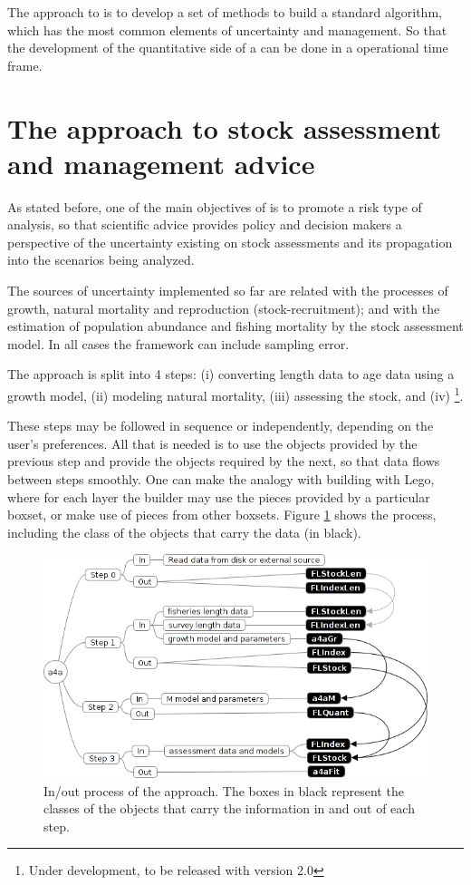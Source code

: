 \documentclass[a4paper,english,10pt]{article}\usepackage[]{graphicx}\usepackage[]{color}
\begin{document}
The \aFa approach to \MSE is to develop a set of methods to build a standard algorithm, which has the most common elements of uncertainty and management. So that the development of the quantitative side of a \MSE can be done in a operational time frame.

\section{The \aFa approach to stock assessment and management advice}

As stated before, one of the main objectives of \aFa is to promote a risk type of analysis, so that scientific advice provides policy and decision makers a perspective of the uncertainty existing on stock assessments and its propagation into the scenarios being analyzed.

The sources of uncertainty implemented so far are related with the processes of growth, natural mortality and reproduction (stock-recruitment); and with the estimation of population abundance and fishing mortality by the stock assessment model. In all cases the framework can include sampling error.

The approach is split into 4 steps: (i) converting length data to age data using a growth model, (ii) modeling natural mortality, (iii) assessing the stock, and (iv) \MSE\footnote{Under development, to be released with version 2.0}.

These steps may be followed in sequence or independently, depending on the user's preferences. All that is needed is to use the objects provided by the previous step and provide the objects required by the next, so that data flows between steps smoothly. One can make the analogy with building with Lego, where for each layer the builder may use the pieces provided by a particular boxset, or make use of pieces from other boxsets. Figure \ref{fig:inout} shows the process, including the class of the objects that carry the data (in black).

\begin{figure}[H]
\centering
\includegraphics[width=\textwidth]{./inout}
\caption{In/out process of the \aFa approach. The boxes in black represent the classes of the objects that carry the information in and out of each step.}
\label{fig:inout}
\end{figure}
\end{document}
